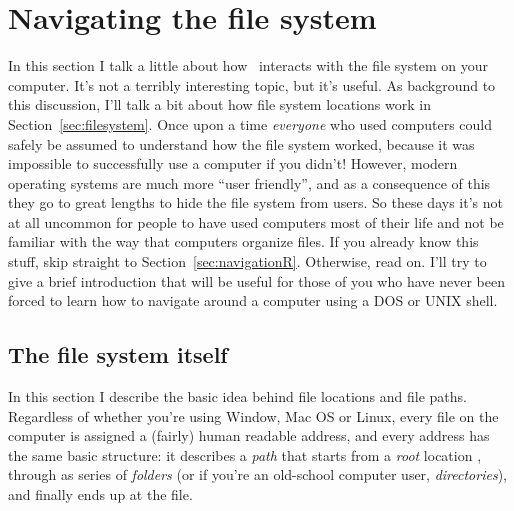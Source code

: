 \section{Navigating the file system\label{sec:navigation}}


In this section I talk a little about how \R\ interacts with the file system on your computer. It's not a terribly interesting topic, but it's useful.  As background to this discussion, I'll talk a bit about how file system locations work in Section~\ref{sec:filesystem}. Once upon a time {\it everyone} who used computers could safely be assumed to understand how the file system worked, because it was impossible to successfully use a computer if you didn't! However, modern operating systems are much more ``user friendly'', and as a consequence of this they go to great lengths to hide the file system from users. So these days it's not at all uncommon for people to have used computers most of their life and not be familiar with the way that computers organize files. If you already know this stuff, skip straight to Section~\ref{sec:navigationR}. Otherwise, read on. I'll try to give a brief introduction that will be useful for those of you who have never been forced to learn how to navigate around a computer using a DOS or UNIX shell. 

\subsection{The file system itself~\label{sec:filesystem}}

In this section I describe the basic idea behind file locations and file paths. Regardless of whether you're using Window, Mac OS or Linux, every file on the computer is assigned a (fairly) human readable address, and every address has the same basic structure: it describes a {\it path} that starts from a {\it root} location , through as series of {\it folders} (or if you're an old-school computer user, {\it directories}), and finally ends up at the file. 


